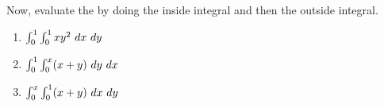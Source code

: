 \documentclass[12pt, a4paper]{article}
\begin{document}
  \vspace{-2in}
  \begin{ex}
    Now, evaluate the  by doing the inside
    integral and then the outside integral.
    \begin{enumerate}
    \item \(\int_0^1 \int_0^1 x y^2 \dx\ dy\)
      \vspace{1in}
    \item \(\int_0^1 \int_0^x (x+y)\ dy \ d x\)
      \vspace{1in}
    \item \(\int_0^x \int_0^1 (x+y) \dx\ dy\)
    \end{enumerate}

  \end{ex}
\end{document}
